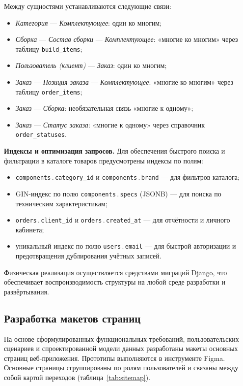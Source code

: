 Между сущностями устанавливаются следующие связи:
\begin{itemize}
    \item \emph{Категория} --- \emph{Комплектующее}: один ко многим;
    \item \emph{Сборка} --- \emph{Состав сборки} --- \emph{Комплектующее}: «многие ко многим» через таблицу \texttt{build\_\allowbreak items};
    \item \emph{Пользователь (клиент)} --- \emph{Заказ}: один ко многим;
    \item \emph{Заказ} --- \emph{Позиция заказа} --- \emph{Комплектующее}: «многие ко многим» через таблицу \texttt{order\_\allowbreak items};
    \item \emph{Заказ} --- \emph{Сборка}: необязательная связь «многие к одному»;
    \item \emph{Заказ} --- \emph{Статус заказа}: «многие к одному» через справочник \texttt{order\_\allowbreak statuses}.
\end{itemize}

\textbf{Индексы и оптимизация запросов.} Для обеспечения быстрого поиска и фильтрации в каталоге товаров предусмотрены индексы по полям:
\begin{itemize}
    \item \texttt{components}\,.\,\texttt{category\_id} и \texttt{components}\,.\,\texttt{brand} --- для фильтров каталога;
    \item GIN-индекс по полю \texttt{components}\,.\,\texttt{specs} (JSONB) --- для поиска по техническим характеристикам;
    \item \texttt{orders}\,.\,\texttt{client\_id} и \texttt{orders}\,.\,\texttt{created\_at} --- для отчётности и личного кабинета;
    \item уникальный индекс по полю \texttt{users}\,.\,\texttt{email} --- для быстрой авторизации и предотвращения дублирования учётных записей.
\end{itemize}

Физическая реализация осуществляется средствами миграций Django, что обеспечивает воспроизводимость структуры на любой среде разработки и развёртывания.

\subsection{Разработка макетов страниц}

На основе сформулированных функциональных требований, пользовательских сценариев и спроектированной модели данных разработаны макеты основных страниц веб-приложения. Прототипы выполняются в инструменте Figma. Основные страницы сгруппированы по ролям пользователей и связаны между собой картой переходов (таблица~\ref{tab:sitemap}).

